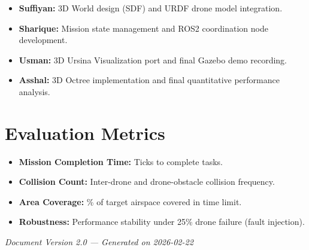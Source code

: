 \documentclass[11pt,a4paper]{article}
\begin{document}
\begin{itemize}
    \item \textbf{Suffiyan:} 3D World design (SDF) and URDF drone model integration.
    \item \textbf{Sharique:} Mission state management and ROS2 coordination node development.
    \item \textbf{Usman:} 3D Ursina Visualization port and final Gazebo demo recording.
    \item \textbf{Asshal:} 3D Octree implementation and final quantitative performance analysis.
\end{itemize}

\section{Evaluation Metrics}
\begin{itemize}[noitemsep]
    \item \textbf{Mission Completion Time:} Ticks to complete tasks.
    \item \textbf{Collision Count:} Inter-drone and drone-obstacle collision frequency.
    \item \textbf{Area Coverage:} \% of target airspace covered in time limit.
    \item \textbf{Robustness:} Performance stability under 25\% drone failure (fault injection).
\end{itemize}

\vspace{1cm}
\begin{center}
    \textit{Document Version 2.0 --- Generated on 2026-02-22}
\end{center}
\end{document}
